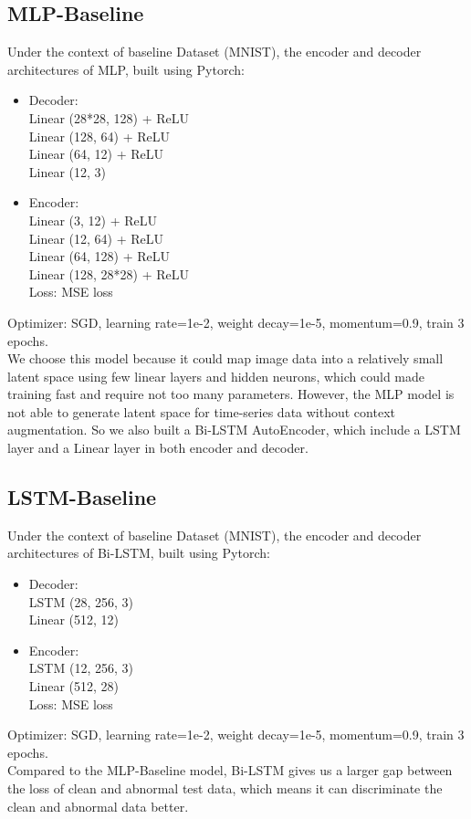\documentclass{article}
\begin{document}
\subsection{MLP-Baseline}
Under the context of baseline Dataset (MNIST), the encoder and decoder architectures of MLP, built using Pytorch: 
\begin{itemize}
\item Decoder: \\
Linear (28*28, 128) + ReLU \\
Linear (128, 64) + ReLU \\
Linear (64, 12) + ReLU \\
Linear (12, 3) \\
\item Encoder: \\
Linear (3, 12) + ReLU \\
Linear (12, 64) + ReLU \\
Linear (64, 128) + ReLU \\
Linear (128, 28*28) + ReLU \\
Loss: MSE loss \\
\end{itemize}
Optimizer: SGD, learning rate=1e-2, weight decay=1e-5, momentum=0.9, train 3 epochs.\\
We choose this model because it could map image data into a relatively small latent space using few linear layers and hidden neurons, which could made training fast and require not too many parameters. 
However, the MLP model is not able to generate latent space for time-series data without context augmentation. So we also built a Bi-LSTM AutoEncoder, which include a LSTM layer and a Linear layer in both encoder and decoder.  

\subsection{LSTM-Baseline}
Under the context of baseline Dataset (MNIST), the encoder and decoder architectures of Bi-LSTM, built using Pytorch: 
\begin{itemize}
\item Decoder: \\
LSTM (28, 256, 3)  \\
Linear (512, 12) \\
\item Encoder: \\
LSTM (12, 256, 3)  \\
Linear (512, 28) \\
Loss: MSE loss \\
\end{itemize}
Optimizer: SGD, learning rate=1e-2, weight decay=1e-5, momentum=0.9, train 3 epochs.\\
Compared to the MLP-Baseline model, Bi-LSTM gives us a larger gap between the loss of clean and abnormal test data, which means it can discriminate the clean and abnormal data better.
\end{document}
